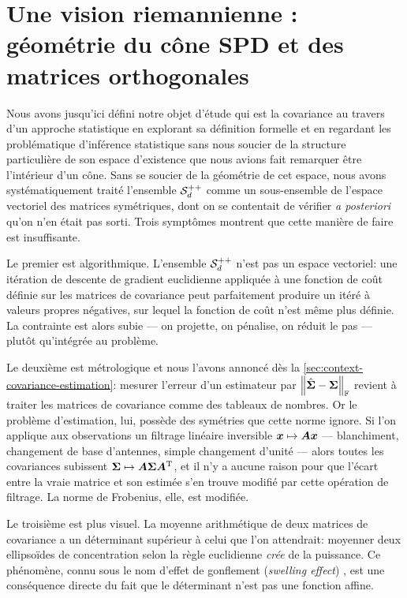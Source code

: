 \chapter{Une vision riemannienne : géométrie du cône SPD et des matrices orthogonales}
\label{ch:context-riemann}


Nous avons jusqu'ici défini notre objet d'étude qui est la covariance au travers d'un approche statistique en explorant sa définition formelle et en regardant les problématique d'inférence statistique sans nous soucier de la structure particulière de son espace d'existence que nous avions fait remarquer être l'intérieur d'un cône. Sans se soucier de la géométrie de cet espace, nous avons systématiquement traité l'ensemble $\mathcal{S}_{d}^{++}$ comme un sous-ensemble de l'espace vectoriel des matrices symétriques, dont on se contentait de vérifier \emph{a posteriori} qu'on n'en était pas sorti. Trois symptômes montrent que cette manière de faire est insuffisante.

Le premier est algorithmique. L'ensemble $\mathcal{S}_{d}^{++}$ n'est pas un espace vectoriel: une itération de descente de gradient euclidienne appliquée à une fonction de coût définie sur les matrices de covariance peut parfaitement produire un itéré à valeurs propres négatives, sur lequel la fonction de coût n'est même plus définie. La contrainte est alors subie --- on projette, on pénalise, on réduit le pas --- plutôt qu'intégrée au problème.

Le deuxième est métrologique et nous l'avons annoncé dès la \cref{sec:context-covariance-estimation}: mesurer l'erreur d'un estimateur par $\left\lVert\hat{\boldsymbol{\Sigma}}-\boldsymbol{\Sigma}\right\rVert_{\mathbb{F}}$ revient à traiter les matrices de covariance comme des tableaux de nombres. Or le problème d'estimation, lui, possède des symétries que cette norme ignore. Si l'on applique aux observations un filtrage linéaire inversible $\boldsymbol{x}\mapsto\boldsymbol{A}\boldsymbol{x}$ --- blanchiment, changement de base d'antennes, simple changement d'unité --- alors toutes les covariances subissent $\boldsymbol{\Sigma}\mapsto\boldsymbol{A}\boldsymbol{\Sigma}\boldsymbol{A}^{\mathrm{T}}$, et il n'y a aucune raison pour que l'écart entre la vraie matrice et son estimée s'en trouve modifié par cette opération de filtrage. La norme de Frobenius, elle, est modifiée.

Le troisième est plus visuel. La moyenne arithmétique de deux matrices de covariance a un déterminant supérieur à celui que l'on attendrait: moyenner deux ellipsoïdes de concentration selon la règle euclidienne \emph{crée} de la puissance. Ce phénomène, connu sous le nom d'effet de gonflement (\textit{swelling effect}) , est une conséquence directe du fait que le déterminant n'est pas une fonction affine. \\

